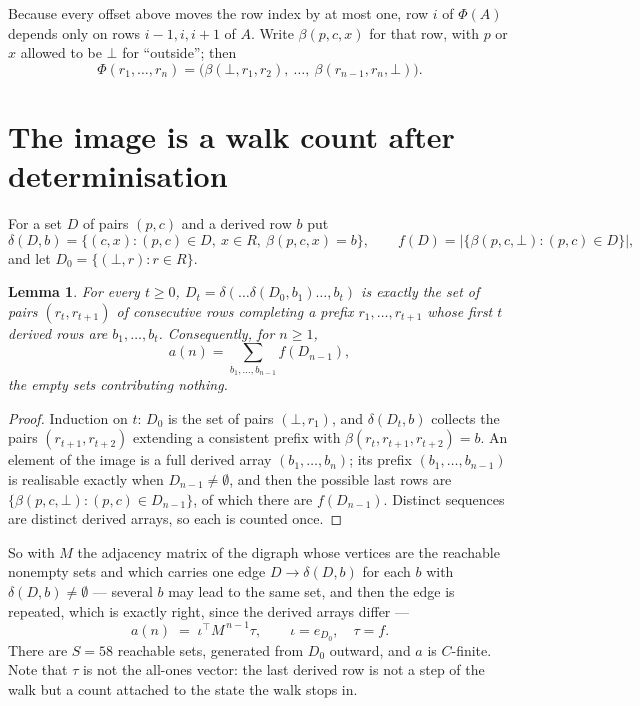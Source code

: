 \documentclass[11pt,a4paper]{article}
\theoremstyle{plain}
\newtheorem{lemma}[theorem]{Lemma}
\theoremstyle{definition}
\begin{document}
Because every offset above moves the row index by at most one, row $i$ of
$\Phi(A)$ depends only on rows $i-1,i,i+1$ of $A$. Write $\beta(p,c,x)$ for that row, with $p$
or $x$ allowed to be $\bot$ for ``outside''; then
\[
\Phi(r_1,\dots,r_n)=\bigl(\beta(\bot,r_1,r_2),\ \dots,\ \beta(r_{n-1},r_n,\bot)\bigr).
\]

\section{The image is a walk count after determinisation}

For a set $D$ of pairs $(p,c)$ and a derived row $b$ put
\[
\delta(D,b)=\{(c,x):(p,c)\in D,\ x\in R,\ \beta(p,c,x)=b\},\qquad
f(D)=\bigl|\{\beta(p,c,\bot):(p,c)\in D\}\bigr| ,
\]
and let $D_0=\{(\bot,r):r\in R\}$.

\begin{lemma}\label{lem:det}
For every $t\ge0$, $D_t=\delta(\dots\delta(D_0,b_1)\dots,b_t)$ is exactly the set of pairs
$(r_t,r_{t+1})$ of consecutive rows completing a prefix $r_1,\dots,r_{t+1}$ whose first $t$
derived rows are $b_1,\dots,b_t$. Consequently, for $n\ge1$,
\[
a(n)=\sum_{b_1,\dots,b_{n-1}}f(D_{n-1}),
\]
the empty sets contributing nothing.
\end{lemma}

\begin{proof}
Induction on $t$: $D_0$ is the set of pairs $(\bot,r_1)$, and $\delta(D_t,b)$ collects the
pairs $(r_{t+1},r_{t+2})$ extending a consistent prefix with
$\beta(r_t,r_{t+1},r_{t+2})=b$. An element of the image is a full derived array
$(b_1,\dots,b_n)$; its prefix $(b_1,\dots,b_{n-1})$ is realisable exactly when
$D_{n-1}\neq\emptyset$, and then the possible last rows are
$\{\beta(p,c,\bot):(p,c)\in D_{n-1}\}$, of which there are $f(D_{n-1})$. Distinct sequences
are distinct derived arrays, so each is counted once.
\end{proof}

So with $M$ the adjacency matrix of the digraph whose vertices are the reachable nonempty sets
and which carries one edge $D\to\delta(D,b)$ for each $b$ with $\delta(D,b)\neq\emptyset$ ---
several $b$ may lead to the same set, and then the edge is repeated, which is exactly right,
since the derived arrays differ ---
\[
a(n)\;=\;\iota^{\!\top}M^{\,n-1}\tau,\qquad \iota=e_{D_0},\quad \tau=f .
\]
There are $S=58$ reachable sets, generated from $D_0$ outward, and $a$ is $C$-finite.
Note that $\tau$ is not the all-ones vector: the last derived row is not a
step of the walk but a count attached to the state the walk stops in.
\end{document}
